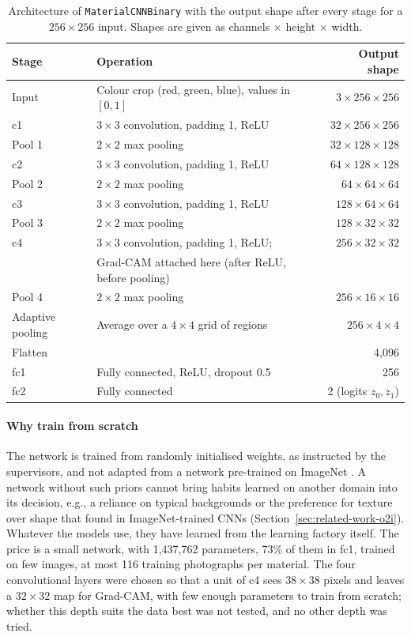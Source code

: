 \begin{table}[htbp]
\centering
\caption[Architecture of MaterialCNNBinary]{Architecture of \texttt{MaterialCNNBinary}
with the output shape after every stage for a $256 \times 256$ input. Shapes are given
as channels $\times$ height $\times$ width.}
\label{tab:cnn-architecture}
\small
\begin{tabular}{l p{6cm} r}
\toprule
Stage & Operation & Output shape \\
\midrule
Input & Colour crop (red, green, blue), values in $[0,1]$ & $3 \times 256 \times 256$ \\
c1 & $3 \times 3$ convolution, padding 1, ReLU & $32 \times 256 \times 256$ \\
Pool 1 & $2 \times 2$ max pooling & $32 \times 128 \times 128$ \\
c2 & $3 \times 3$ convolution, padding 1, ReLU & $64 \times 128 \times 128$ \\
Pool 2 & $2 \times 2$ max pooling & $64 \times 64 \times 64$ \\
c3 & $3 \times 3$ convolution, padding 1, ReLU & $128 \times 64 \times 64$ \\
Pool 3 & $2 \times 2$ max pooling & $128 \times 32 \times 32$ \\
c4 & $3 \times 3$ convolution, padding 1, ReLU; & $256 \times 32 \times 32$ \\
 & Grad-CAM attached here (after ReLU, before pooling) & \\
Pool 4 & $2 \times 2$ max pooling & $256 \times 16 \times 16$ \\
Adaptive pooling & Average over a $4 \times 4$ grid of regions & $256 \times 4 \times 4$ \\
Flatten & & 4,096 \\
fc1 & Fully connected, ReLU, dropout 0.5 & 256 \\
fc2 & Fully connected & 2 (logits $z_0, z_1$) \\
\bottomrule
\end{tabular}
\end{table}

\paragraph{Why train from scratch}
The network is trained from randomly initialised weights, as instructed by the
supervisors, and not adapted from a network pre-trained on
ImageNet \citep{deng2009imagenet}. A network without such priors cannot bring habits
learned on another domain into its decision, e.g., a reliance on typical backgrounds or
the preference for texture over shape that \citet{geirhos2019texture}
found in ImageNet-trained CNNs (Section~\ref{sec:related-work-o2i}). Whatever the models
use, they have learned from the learning factory itself. The price is a small network, with 1,437,762 parameters, 73\% of them in fc1, trained
on few images, at most 116 training photographs per material. The four convolutional
layers were chosen so that a unit of c4 sees $38 \times 38$ pixels and leaves a
$32 \times 32$ map for Grad-CAM, with few enough parameters to train from scratch;
whether this depth suits the data best was not tested, and no other depth was tried.

